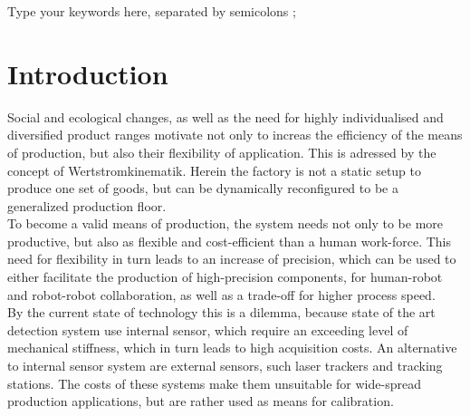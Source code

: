 \documentclass[5p,times,procedia]{elsarticle}
\begin{document}
\begin{frontmatter}
\begin{keyword}
Type your keywords here, separated by semicolons ;




\end{keyword}

\end{frontmatter}



\section{Introduction}

%
%
%
%
%

Social and ecological changes, as well as the need for
highly individualised and diversified product ranges
motivate not only to increas the efficiency of the means
of production, but also their flexibility of application.
This is adressed by the concept of Wertstromkinematik.
Herein the factory is not a static setup to produce
one set of goods, but can be dynamically reconfigured to be a generalized production floor.\\
To become a valid means of production, the system needs not only to
be more productive, but also as flexible and cost-efficient than a human work-force. This need for flexibility in turn leads to an increase of precision, which can be used to either facilitate the production of high-precision components, for human-robot and robot-robot collaboration, as well as a trade-off for higher process speed.\\
By the current state of technology this is a dilemma, because state of the art detection system use internal sensor, which require an exceeding level of mechanical stiffness, which in turn leads to high
acquisition costs. An alternative to internal sensor system are external sensors, such laser trackers and tracking stations. The costs of these systems make them unsuitable for wide-spread production applications, but are rather used as means for calibration.\\
\end{document}
